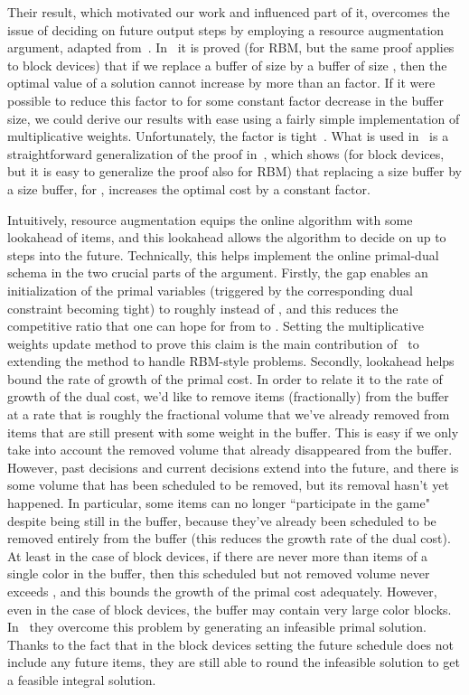 \documentclass[12pt]{article}
\begin{document}
Their result, which motivated our work and
influenced part of it, overcomes the issue of deciding on
future output steps by employing a resource augmentation 
argument, adapted from~\cite{ERW09}. In~\cite{EW05,ERW09} 
it is proved (for RBM, but the same proof applies to block
devices) that if we replace a buffer of size  by a buffer of 
size , then the optimal value of a solution cannot 
increase by more than an  factor. If it were possible 
to reduce this factor to  for some constant factor decrease
in the buffer size, we could derive our results with ease using 
a fairly simple implementation of multiplicative weights. 
Unfortunately, the  factor is tight~\cite{Abo08}.
What is used in~\cite{ACER12} is a straightforward generalization 
of the proof in~\cite{ERW09}, which shows (for block devices,
but it is easy to generalize the proof also for RBM) that replacing 
a size  buffer by a size  buffer, for 
, increases the
optimal cost by a constant factor. 

Intuitively, resource augmentation
equips the online algorithm with some lookahead of  items,
and this lookahead allows the algorithm to decide on up to  
steps into the future. Technically, this helps implement the online
primal-dual schema in the two crucial parts of the argument.
Firstly, the gap enables an initialization of the primal variables
(triggered by the corresponding dual constraint becoming tight)
to roughly  instead of , and this reduces
the competitive ratio that one can hope for from  to 
.
Setting the multiplicative weights update method to prove this claim
is the main contribution of~\cite{ACER12} to extending the method
to handle RBM-style problems.
Secondly, lookahead helps bound the rate of
growth of the primal cost. In order to relate it to the rate of growth
of the dual cost, we'd like to remove items (fractionally) from the
buffer at a rate that is roughly the fractional volume that we've
already removed from items that are still present with some
weight in the buffer. This is easy if we only take into account
the removed volume that already disappeared from the buffer.
However, past decisions and current decisions extend into the
future, and there is some volume that has been scheduled to be
removed, but its removal hasn't yet happened. In particular,
some items can no longer ``participate in the game" despite
being still in the buffer, because they've already been scheduled
to be removed entirely from the buffer (this reduces the growth
rate of the dual cost). At least in the
case of block devices, if there are never more than 
items of a single color in the buffer, then this scheduled but
not removed volume never exceeds , and this bounds
the growth of the primal cost adequately. However, even in the
case of block devices, the buffer may contain very large color
blocks. In~\cite{ACER12} they overcome this problem by generating
an infeasible primal solution. Thanks to the fact that in the
block devices setting the future schedule does not include any
future items, they are still able to round the infeasible solution
to get a feasible integral solution.
\end{document}
